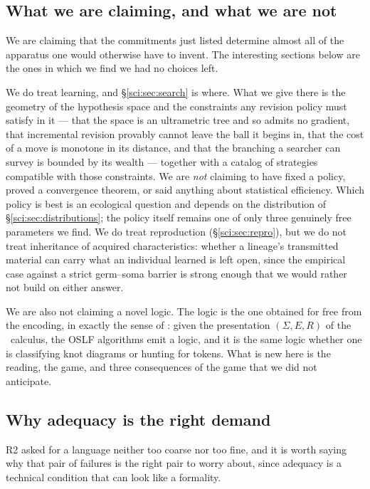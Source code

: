 \subsection{What we are claiming, and what we are not}\label{sci:S1.4}

We are claiming that the commitments just listed determine almost all of the apparatus one would
otherwise have to invent. The interesting sections below are the ones in which we find we had no
choices left.

We do treat learning, and \S\ref{sci:sec:search} is where. What we give there is the geometry of the
hypothesis space and the constraints any revision policy must satisfy in it --- that the space is an
ultrametric tree and so admits no gradient, that incremental revision provably cannot leave the ball it
begins in, that the cost of a move is monotone in its distance, and that the branching a searcher can
survey is bounded by its wealth --- together with a catalog of strategies compatible with those
constraints. We are \emph{not} claiming to have fixed a policy, proved a convergence theorem, or said
anything about statistical efficiency. Which policy is best is an ecological question and depends on
the distribution of \S\ref{sci:sec:distributions}; the policy itself remains one of only three genuinely
free parameters we find. We do treat reproduction (\S\ref{sci:sec:repro}), but we do not treat inheritance of
acquired characteristics: whether a lineage's transmitted material can carry what an individual
learned is left open, since the empirical case against a strict germ--soma barrier
\cite{Noble} is strong enough that we would rather not build on either answer.

We are also not claiming a novel logic. The logic is the one obtained for free from the encoding, in
exactly the sense of \cite{ClassifierNote}: given the presentation $(\Sigma, E, R)$ of the \rhoc\
calculus, the OSLF algorithms emit a logic, and it is the same logic whether one is classifying knot
diagrams or hunting for tokens. What is new here is the reading, the game, and three consequences of
the game that we did not anticipate.

\subsection{Why adequacy is the right demand}\label{sci:S1.5}

R2 asked for a language neither too coarse nor too fine, and it is worth saying why that pair of
failures is the right pair to worry about, since adequacy is a technical condition that can look like
a formality.


